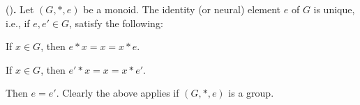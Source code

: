 \textnormal{()}\textbf{.}
  Let $(G, *, e)$ be a monoid.
  The identity (or neural) element $e$ of $G$ is unique, i.e.,
  if $e,e' \in G$, satisfy the following:
  \begin{myenum}
    \item If $x \in G$, then $e * x = x = x * e$.
    \item If $x \in G$, then $e' * x = x = x * e'$.
    \end{myenum}        
  Then $e = e'$.
  Clearly the above applies if $(G, *, e)$ is a group.
